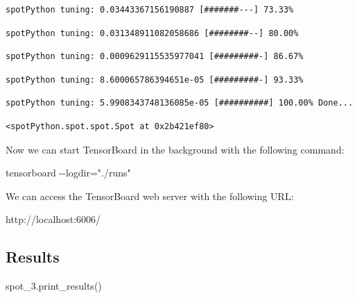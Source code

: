 \documentclass[
  letterpaper,
  DIV=11,
  numbers=noendperiod]{scrreprt}
\newenvironment{Shaded}{\begin{snugshade}}{\end{snugshade}}
\newcommand{\NormalTok}[1]{\textcolor[rgb]{0.00,0.23,0.31}{#1}}
\begin{document}
\begin{verbatim}
spotPython tuning: 0.03443367156190887 [#######---] 73.33% 
\end{verbatim}

\begin{verbatim}
spotPython tuning: 0.031348911082058686 [########--] 80.00% 
\end{verbatim}

\begin{verbatim}
spotPython tuning: 0.0009629115535977041 [#########-] 86.67% 
\end{verbatim}

\begin{verbatim}
spotPython tuning: 8.600065786394651e-05 [#########-] 93.33% 
\end{verbatim}

\begin{verbatim}
spotPython tuning: 5.9908343748136085e-05 [##########] 100.00% Done...
\end{verbatim}

\begin{verbatim}
<spotPython.spot.spot.Spot at 0x2b421ef80>
\end{verbatim}

Now we can start TensorBoard in the background with the following
command:

\begin{Shaded}
\begin{Highlighting}[]
\NormalTok{tensorboard {-}{-}logdir="./runs"}
\end{Highlighting}
\end{Shaded}

We can access the TensorBoard web server with the following URL:

\begin{Shaded}
\begin{Highlighting}[]
\NormalTok{http://localhost:6006/}
\end{Highlighting}
\end{Shaded}

\hypertarget{results}{%
\subsection{Results}\label{results}}

\begin{Shaded}
\begin{Highlighting}[]
\NormalTok{spot\_3.print\_results()}
\end{Highlighting}
\end{Shaded}
\end{document}
